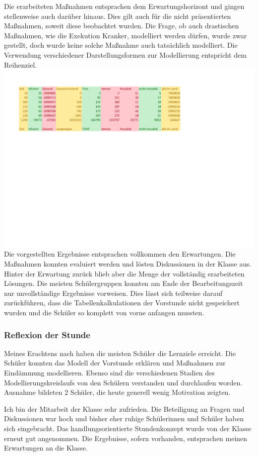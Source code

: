 Die erarbeiteten Maßnahmen entsprachen dem Erwartungshorizont und gingen stellenweise auch darüber hinaus. Dies gilt auch für die nicht präsentierten Maßnahmen, soweit diese beobachtet wurden. Die Frage, ob auch drastischen Maßnahmen, wie die Exekution Kranker, modelliert werden dürfen, wurde zwar gestellt, doch wurde keine solche Maßnahme auch tatsächlich modelliert. Die Verwendung verschiedener Darstellungsformen zur Modellierung entspricht dem Reihenziel.
\includegraphics[width=\textwidth]{projekt/leistung_3_2}
Die vorgestellten Ergebnisse entsprachen vollkommen den Erwartungen. Die Maßnahmen konnten evaluiert werden und lösten Diskussionen in der Klasse aus. Hinter der Erwartung zurück blieb aber die Menge der vollständig erarbeiteten Lösungen. Die meisten Schülergruppen konnten am Ende der Bearbeitungszeit nur unvollständige Ergebnisse vorweisen. Dies lässt sich teilweise darauf zurückführen, dass die Tabellenkalkulationen der Vorstunde nicht gespeichert wurden und die Schüler so komplett von vorne anfangen mussten. 
\subsubsection*{Reflexion der Stunde}
Meines Erachtens nach haben die meisten Schüler die Lernziele erreicht. Die Schüler konnten das Modell der Vorstunde erklären und Maßnahmen zur Eindämmung modellieren. Ebenso sind die verschiedenen Stadien des Modellierungskreislaufs von den Schülern verstanden und durchlaufen worden. Ausnahme bildeten 2 Schüler, die heute generell wenig Motivation zeigten. 

Ich bin der Mitarbeit der Klasse sehr zufrieden. Die Beteiligung an Fragen und Diskussionen war hoch und bisher eher ruhige Schülerinnen und Schüler haben sich eingebracht. Das handlungsorientierte Stundenkonzept wurde von der Klasse erneut gut angenommen. Die Ergebnisse, sofern vorhanden, entsprachen meinen Erwartungen an die Klasse.

